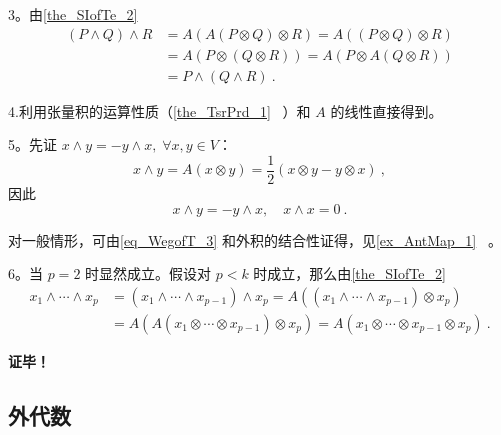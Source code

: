 3。由\autoref{the_SIofTe_2}~
\begin{equation}
\begin{aligned}
(P\wedge Q)\wedge R&=A(A(P\otimes Q)\otimes R)=A((P\otimes Q)\otimes R)\\
&=A(P\otimes (Q\otimes R))=A(P\otimes A(Q\otimes R))\\
&=P\wedge (Q\wedge R)~.
\end{aligned}
\end{equation}

4.利用张量积的运算性质（\autoref{the_TsrPrd_1}~ ）和 $A$ 的线性直接得到。

5。先证 $x\wedge y=-y\wedge x,\;\forall x,y\in V$：
\begin{equation}
x\wedge y=A(x\otimes y)=\frac{1}{2}(x\otimes y-y\otimes x)~,
\end{equation}
因此
\begin{equation}\label{eq_WegofT_3}
x\wedge y=-y\wedge x,\quad x\wedge x=0~.
\end{equation}

对一般情形，可由\autoref{eq_WegofT_3} 和外积的结合性证得，见\autoref{ex_AntMap_1}~ 。

6。当 $p=2$ 时显然成立。假设对 $p<k$ 时成立，那么由\autoref{the_SIofTe_2}~
\begin{equation}
\begin{aligned}
x_1\wedge\cdots\wedge x_p&=(x_1\wedge\cdots\wedge x_{p-1})\wedge x_p=A((x_1\wedge\cdots\wedge x_{p-1})\otimes x_p)\\
&=A(A(x_1\otimes\cdots\otimes x_{p-1})\otimes x_p)=A(x_1\otimes\cdots\otimes x_{p-1}\otimes x_p)~.
\end{aligned}
\end{equation}

\textbf{证毕！}

\subsection{外代数}

